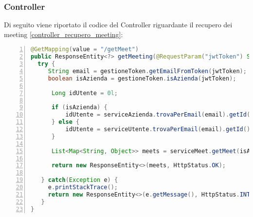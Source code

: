 \subsubsection{Controller}
Di seguito viene riportato il codice del Controller riguardante il recupero dei meeting \ref{controller_recupero_meeting}: 
\begin{lstlisting}[language=java, frame=lines, basicstyle=\ttfamily\scriptsize, numbers=left, 
  caption={controller recupero meeting}, label={controller_recupero_meeting}]
@GetMapping(value = "/getMeet")
public ResponseEntity<?> getMeeting(@RequestParam("jwtToken") String jwtToken) {
  try {
     String email = gestioneToken.getEmailFromToken(jwtToken);
     boolean isAzienda = gestioneToken.isAzienda(jwtToken);

	  Long idUtente = 0l;

	  if (isAzienda) {
		  idUtente = serviceAzienda.trovaPerEmail(email).getId();
	  } else {
		  idUtente = serviceUtente.trovaPerEmail(email).getId();
	  }

	  List<Map<String, Object>> meets = serviceMeet.getMeet(isAzienda, idUtente);

	  return new ResponseEntity<>(meets, HttpStatus.OK);

   } catch(Exception e) {
     e.printStackTrace();
     return new ResponseEntity<>(e.getMessage(), HttpStatus.INTERNAL_SERVER_ERROR);
   }
}    
\end{lstlisting}
